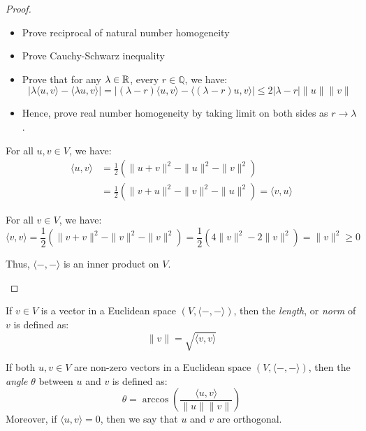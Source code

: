 \begin{proof}
\begin{description}[labelwidth=\widthof{\bfseries ($\Rightarrow$):~}]
\begin{description}[labelwidth=\widthof{\bfseries Positive-definiteness:~}]
\begin{itemize}
				            \item Prove reciprocal of natural number homogeneity
				            \item Prove Cauchy-Schwarz inequality
				            \item Prove that for any $\lambda \in \operatorname{\mathbb{R}}$, every $r \in \mathbb{Q}$, we have:
				                  \[
					                  | \lambda \langle u, v \rangle - \langle \lambda u, v \rangle | = | (\lambda - r) \langle u, v \rangle - \langle (\lambda - r) u, v \rangle | \leq 2|\lambda - r| \| u \| \| v \|
				                  \]
				            \item Hence, prove real number homogeneity by taking limit on both sides as $r \to \lambda$.
			            \end{itemize}

			      \item[Symmetry] For all $u, v \in V$, we have:
			            \begin{align*}
				            \langle u, v \rangle & = \frac{1}{2} \left( \| u + v \|^2 - \| u \|^2 - \| v \|^2 \right)                        \\
				                                 & = \frac{1}{2} \left( \| v + u \|^2 - \| v \|^2 - \| u \|^2 \right) = \langle v, u \rangle
			            \end{align*}

			      \item[Positive-definiteness] For all $v \in V$, we have:
			            \[
				            \langle v, v \rangle = \frac{1}{2} \left( \| v + v \|^2 - \| v \|^2 - \| v \|^2 \right) = \frac{1}{2} (4 \| v \|^2 - 2 \| v \|^2) = \| v \|^2 \geq 0
			            \]
		      \end{description}
		      Thus, $\langle -, - \rangle$ is an inner product on $V$. \qedhere
	\end{description}
\end{proof}

\begin{definition}[Length]\label{def:length}
	If $v \in V$ is a vector in a Euclidean space $(V, \langle -, - \rangle)$, then the \emph{length}, or \emph{norm} of $v$ is defined as:
	\[
		\| v \| = \sqrt{\langle v, v \rangle}
	\]
\end{definition}

\begin{definition}[Angle]\label{def:angle}
	If both $u, v \in V$ are non-zero vectors in a Euclidean space $(V, \langle -, - \rangle)$, then the \emph{angle} $\theta$ between $u$ and $v$ is defined as:
	\[
		\theta = \arccos{\left( \frac{\langle u, v \rangle}{\| u \| \| v \|} \right)}
	\]
	Moreover, if $\langle u, v \rangle = 0$, then we say that $u$ and $v$ are orthogonal.
\end{definition}

